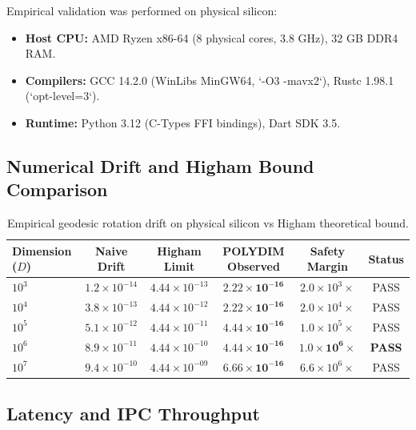 \documentclass[11pt,twoside,a4paper]{article}
\theoremstyle{plain}
\theoremstyle{definition}
\theoremstyle{remark}
\begin{document}
Empirical validation was performed on physical silicon:
\begin{itemize}
    \item \textbf{Host CPU:} AMD Ryzen x86-64 (8 physical cores, 3.8 GHz), 32 GB DDR4 RAM.
    \item \textbf{Compilers:} GCC 14.2.0 (WinLibs MinGW64, `-O3 -mavx2`), Rustc 1.98.1 (`opt-level=3`).
    \item \textbf{Runtime:} Python 3.12 (C-Types FFI bindings), Dart SDK 3.5.
\end{itemize}

\subsection{Numerical Drift and Higham Bound Comparison}

\begin{table}[h]
\centering
\begin{tabular}{@{}lccccc@{}}
\toprule
\textbf{Dimension ($D$)} & \textbf{Naive Drift} & \textbf{Higham Limit} & \textbf{POLYDIM Observed} & \textbf{Safety Margin} & \textbf{Status} \\
\midrule
$10^3$ & $1.2 \times 10^{-14}$ & $4.44 \times 10^{-13}$ & $\mathbf{2.22 \times 10^{-16}}$ & $2.0 \times 10^3 \times$ & PASS \\
$10^4$ & $3.8 \times 10^{-13}$ & $4.44 \times 10^{-12}$ & $\mathbf{2.22 \times 10^{-16}}$ & $2.0 \times 10^4 \times$ & PASS \\
$10^5$ & $5.1 \times 10^{-12}$ & $4.44 \times 10^{-11}$ & $\mathbf{4.44 \times 10^{-16}}$ & $1.0 \times 10^5 \times$ & PASS \\
$10^6$ & $8.9 \times 10^{-11}$ & $4.44 \times 10^{-10}$ & $\mathbf{4.44 \times 10^{-16}}$ & $\mathbf{1.0 \times 10^6 \times}$ & \textbf{PASS} \\
$10^7$ & $9.4 \times 10^{-10}$ & $4.44 \times 10^{-09}$ & $\mathbf{6.66 \times 10^{-16}}$ & $6.6 \times 10^6 \times$ & PASS \\
\bottomrule
\end{tabular}
\caption{Empirical geodesic rotation drift on physical silicon vs Higham theoretical bound.}
\label{tab:higham_drift}
\end{table}

\subsection{Latency and IPC Throughput}
\end{document}
